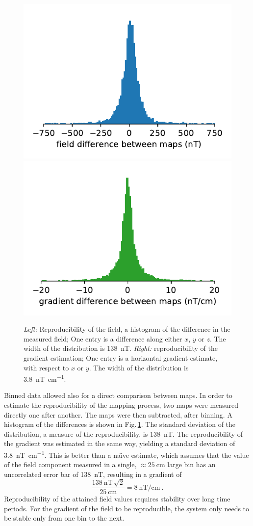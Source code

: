 \begin{figure}
  \centering
  \includegraphics[width=0.49\linewidth]{gfx/mapping/lpsc/reproducibility_field.pdf}
  \includegraphics[width=0.49\linewidth]{gfx/mapping/lpsc/reproducibility_gradient.pdf}
  \caption{\emph{Left:} Reproducibility of the field, a histogram of the difference in the measured field;
  One entry is a difference along either $x$, $y$ or $z$.
  The width of the distribution is \SI{138}{\nano\tesla}.
  \emph{Right:} reproducibility of the gradient estimation;
  One entry is a horizontal gradient estimate, with respect to $x$ or $y$.
  The width of the distribution is \SI[per-mode=symbol]{3.8}{\nano\tesla\per\centi\metre}.}\label{fig:mapping_bastille_reproducibility}
\end{figure}

Binned data allowed also for a direct comparison between maps.
In order to estimate the reproducibility of the mapping process, two maps were measured directly one after another.
The maps were then subtracted, after binning.
A histogram of the differences is shown in Fig.\,\ref{fig:mapping_bastille_reproducibility}.
The standard deviation of the distribution, a measure of the reproducibility, is \SI{138}{\nano\tesla}.
The reproducibility of the gradient was estimated in the same way, yielding a standard deviation of \SI[per-mode=symbol]{3.8}{\nano\tesla\per\centi\metre}.
This is better than a na\"{\i}ve estimate, which assumes that the value of the field component measured in a single,
$\approx \SI{25}{\centi\metre}$ large bin has an uncorrelated error bar of \SI{138}{\nano\tesla}, resulting in a gradient of
\begin{equation}
  \frac{\SI{138}{\nano\tesla} \, \sqrt{2}}{\SI{25}{\centi\meter}} = \SI[per-mode=symbol]{8}{\nano\tesla\per\centi\meter} \ .
\end{equation}
Reproducibility of the attained field values requires stability over long time periods.
For the gradient of the field to be reproducible, the system only needs to be stable only from one bin to the next.

